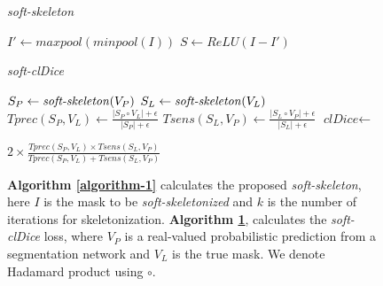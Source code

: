 \begin{figure}[t!]
\begin{minipage}{0.45\textwidth}
\removelatexerror
    \begin{algorithm*}[H]
        \caption{\textit{soft-skeleton}}
        \label{algorithm-1}
        \begin{algorithmic}
        \State $I' \gets \textit{maxpool}(\textit{minpool}(I))$
        \State $S \gets \textit{ReLU}(I-I')$
        \end{algorithmic}
    \end{algorithm*}
    \begin{algorithm*}[H]
        \caption{\textit{soft-clDice}}
        \label{algorithm-2}
        \begin{algorithmic}
            \State $S_P \gets \mbox{\textit{soft-skeleton}}(V_P)$
            \State $S_L \gets \mbox{\textit{soft-skeleton}}(V_L)$
            \State $\textit{Tprec}(S_P, V_L) \gets \frac{|S_P \circ V_L|+\epsilon}{|S_P|+\epsilon}$
            \State $\textit{Tsens}(S_L, V_P) \gets \frac{|S_L \circ V_P|+\epsilon}{|S_L|+\epsilon}$
            \State $\textit{clDice} \gets$ \par
            $2 \times \frac{ \textit{Tprec}(S_P, V_L)\times \textit{Tsens}(S_L, V_P)}{\textit{Tprec}(S_P, V_L)+ \textit{Tsens}(S_L, V_P)}$
        \end{algorithmic}
        \vspace{0.2cm}
    \end{algorithm*}
\end{minipage}    
 \caption{ \textbf{Algorithm \ref{algorithm-1}} calculates the proposed \textit{soft-skeleton}, here $I$ is the mask to be \textit{soft-skeletonized} and $k$ is the number of iterations for skeletonization. \textbf{Algorithm \ref{algorithm-2}}, calculates the \textit{soft-clDice} loss, where $V_P$ is a real-valued probabilistic prediction from a segmentation network and $V_L$ is the true mask. We denote Hadamard product using $\circ$.}
 \vspace{-1.5em}
\end{figure}
